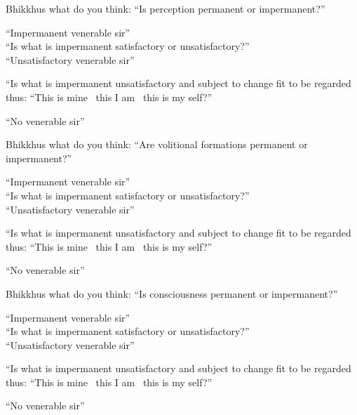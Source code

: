 \begin{english-only-nohang}
  \begin{english-only-hang}
    Bhikkhus what do you think: ``Is perception permanent or impermanent?''
  \end{english-only-hang}
  ``Impermanent venerable sir''\\
  ``Is what is impermanent satisfactory or unsatisfactory?''\\
  ``Unsatisfactory venerable sir''\\
  \begin{english-hangtogether}
    ``Is what is impermanent unsatisfactory and subject to change fit to be regarded thus: ``This is mine \breathmark\ this I am \breathmark\ this is my self?''
  \end{english-hangtogether}
  ``No venerable sir''
\end{english-only-nohang}

\begin{english-only-nohang}
  \begin{english-only-hang}
    Bhikkhus what do you think: ``Are volitional formations permanent or impermanent?''
  \end{english-only-hang}
  ``Impermanent venerable sir''\\
  ``Is what is impermanent satisfactory or unsatisfactory?''\\
  ``Unsatisfactory venerable sir''
  \begin{english-hangtogether}
    ``Is what is impermanent unsatisfactory and subject to change fit to be regarded thus: ``This is mine \breathmark\ this I am \breathmark\ this is my self?''
  \end{english-hangtogether}
  ``No venerable sir''
\end{english-only-nohang}

\begin{english-only-nohang}
  \begin{english-only-hang}
    Bhikkhus what do you think: ``Is consciousness permanent or impermanent?''
  \end{english-only-hang}
  ``Impermanent venerable sir''\\
  ``Is what is impermanent satisfactory or unsatisfactory?''\\
  ``Unsatisfactory venerable sir''\\
  \begin{english-hangtogether}
    ``Is what is impermanent unsatisfactory and subject to change fit to be regarded thus: ``This is mine \breathmark\ this I am \breathmark\ this is my self?''
  \end{english-hangtogether}
  ``No venerable sir''
\end{english-only-nohang}

